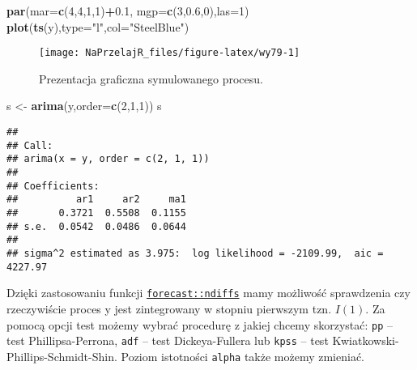\documentclass[polish,]{book}
\newenvironment{Shaded}{\begin{snugshade}}{\end{snugshade}}
\newcommand{\DataTypeTok}[1]{\textcolor[rgb]{0.13,0.29,0.53}{#1}}
\newcommand{\DecValTok}[1]{\textcolor[rgb]{0.00,0.00,0.81}{#1}}
\newcommand{\FloatTok}[1]{\textcolor[rgb]{0.00,0.00,0.81}{#1}}
\newcommand{\KeywordTok}[1]{\textcolor[rgb]{0.13,0.29,0.53}{\textbf{#1}}}
\newcommand{\NormalTok}[1]{#1}
\newcommand{\OperatorTok}[1]{\textcolor[rgb]{0.81,0.36,0.00}{\textbf{#1}}}
\newcommand{\StringTok}[1]{\textcolor[rgb]{0.31,0.60,0.02}{#1}}
\begin{document}
\begin{Shaded}
\begin{Highlighting}[]
\KeywordTok{par}\NormalTok{(}\DataTypeTok{mar=}\KeywordTok{c}\NormalTok{(}\DecValTok{4}\NormalTok{,}\DecValTok{4}\NormalTok{,}\DecValTok{1}\NormalTok{,}\DecValTok{1}\NormalTok{)}\OperatorTok{+}\FloatTok{0.1}\NormalTok{, }\DataTypeTok{mgp=}\KeywordTok{c}\NormalTok{(}\DecValTok{3}\NormalTok{,}\FloatTok{0.6}\NormalTok{,}\DecValTok{0}\NormalTok{),}\DataTypeTok{las=}\DecValTok{1}\NormalTok{)}
\KeywordTok{plot}\NormalTok{(}\KeywordTok{ts}\NormalTok{(y),}\DataTypeTok{type=}\StringTok{"l"}\NormalTok{,}\DataTypeTok{col=}\StringTok{"SteelBlue"}\NormalTok{)}
\end{Highlighting}
\end{Shaded}

\begin{figure}[h]

{\centering \texttt{[image: NaPrzelajR\_files/figure-latex/wy79-1]} 

}

\caption{Prezentacja graficzna symulowanego procesu.}\label{fig:wy79}
\end{figure}

\begin{Shaded}
\begin{Highlighting}[]
\NormalTok{s <-}\StringTok{ }\KeywordTok{arima}\NormalTok{(y,}\DataTypeTok{order=}\KeywordTok{c}\NormalTok{(}\DecValTok{2}\NormalTok{,}\DecValTok{1}\NormalTok{,}\DecValTok{1}\NormalTok{))}
\NormalTok{s}
\end{Highlighting}
\end{Shaded}

\begin{verbatim}
## 
## Call:
## arima(x = y, order = c(2, 1, 1))
## 
## Coefficients:
##          ar1     ar2     ma1
##       0.3721  0.5508  0.1155
## s.e.  0.0542  0.0486  0.0644
## 
## sigma^2 estimated as 3.975:  log likelihood = -2109.99,  aic = 4227.97
\end{verbatim}

Dzięki zastosowaniu funkcji \href{https://rdrr.io/cran/forecast/man/ndiffs.html}{\texttt{forecast::ndiffs}} mamy możliwość sprawdzenia czy rzeczywiście proces y jest zintegrowany w stopniu pierwszym tzn. \(I(1)\). Za pomocą opcji test możemy wybrać procedurę z jakiej chcemy skorzystać: \texttt{pp} -- test Phillipsa-Perrona, \texttt{adf} -- test Dickeya-Fullera lub \texttt{kpss} -- test Kwiatkowski-Phillips-Schmidt-Shin. Poziom istotności \texttt{alpha} także możemy zmieniać.
\end{document}
